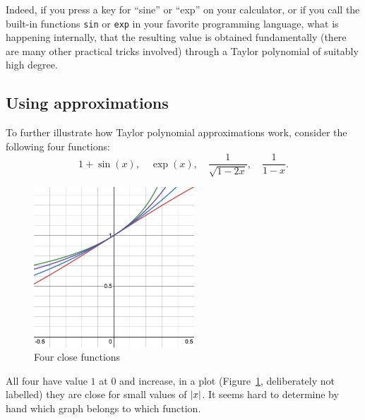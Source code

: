 Indeed, if you press a key for ``sine'' or ``exp'' on your calculator, or if
you call the built-in functions \verb+sin+ or \verb+exp+ in your favorite
programming language, what is happening internally, that the resulting value
is obtained fundamentally (there are many other practical tricks
involved) through a Taylor polynomial of suitably high degree.

\subsection{Using approximations}

To further illustrate how Taylor polynomial approximations work, consider
the following four functions:
\[
1+\sin(x),\quad \exp(x), \quad \frac{1}{\sqrt{1-2x}}, \quad \frac{1}{1-x}.
\]
\begin{figure}
\begin{center}
\includegraphics[width=6cm]{pic/fourtayapprox.png}
\end{center}
\caption{Four close functions}
\label{figfourtayapprox}
\end{figure}
All four have value $1$ at $0$ and increase, in a plot
(Figure~\ref{figfourtayapprox}, deliberately not labelled)
they are close for small values of $\left|x\right|$. It seems hard to determine by
hand which graph belongs to which function.

